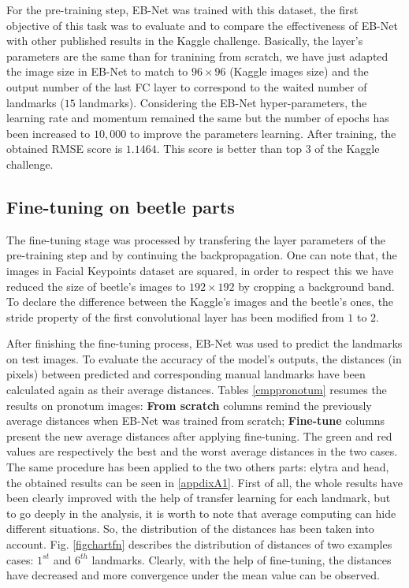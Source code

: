 \documentclass[review]{elsarticle}
\begin{document}
For the pre-training step, EB-Net was trained with this dataset,
the first objective of this task was to evaluate and to compare the
effectiveness of EB-Net with other published results in the
Kaggle challenge. Basically, the layer's parameters are the same than for
tranining from scratch, we have just adapted the image size in EB-Net
to match to $96 \times 96$ (Kaggle images size) and the output number of the last FC layer to
correspond to the waited number of landmarks ($15$
landmarks). Considering the EB-Net hyper-parameters, the learning rate and momentum remained the
same but the number of epochs has been increased to $10,000$ to improve the parameters learning. After training, the
obtained RMSE score is $1.1464$. This score is better than top $3$ of
the Kaggle challenge.

\subsection{Fine-tuning on beetle parts}
The fine-tuning stage was processed by transfering the layer parameters of
the pre-training step and by continuing the backpropagation. One can note that, the images in Facial Keypoints
dataset are squared, in order to respect this we have reduced the size
of beetle's images to $192 \times 192$ by cropping a background
band. To declare the difference between the Kaggle's images and the
beetle's ones, the stride property of the first convolutional
layer has been modified from $1$ to $2$.

After finishing the fine-tuning process, EB-Net was used to predict the
landmarks on test images. To evaluate the accuracy of the model's
outputs, the distances (in pixels) between predicted and corresponding
manual landmarks have been calculated again as their average
distances. Tables \ref{cmppronotum} resumes the results on pronotum
images: \textbf{From scratch} columns remind the previously average
distances when EB-Net was trained from scratch; \textbf{Fine-tune}
columns present the new average distances after applying
fine-tuning. The green and red values are respectively the best and
the worst average distances in the two cases. The same procedure has
been applied to the two others parts: elytra and head, the obtained results can be
seen in \ref{appdixA1}. First of all, the whole results have been clearly
improved with the help of transfer learning for each landmark, but to
go deeply in the analysis, it is worth to note that average computing can hide different situations. So, the distribution of the distances has been taken into
account. Fig. \ref{figchartfn} describes the distribution of distances
of two examples cases: $1^{st}$ and $6^{th}$ landmarks. Clearly, with
the help of fine-tuning, the distances have decreased and more
convergence under the mean value can be observed.
\end{document}

